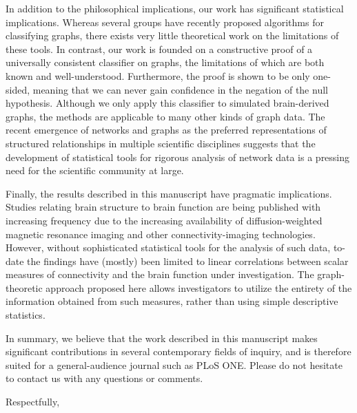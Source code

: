 \documentclass[10pt]{letter}
\begin{document}
\begin{letter}{	%
}
In addition to the philosophical implications, our work has significant statistical implications. 
Whereas several groups have recently proposed algorithms for classifying graphs, there exists very little theoretical work on the limitations of these tools. In contrast, our work is founded on a constructive proof of a universally consistent classifier on graphs, the limitations of which are both known and well-understood. Furthermore, the proof is shown to be only one-sided, meaning that we can never gain confidence in the negation of the null hypothesis. Although we only apply this classifier to simulated brain-derived graphs, the methods are applicable to many other kinds of graph data. The recent emergence of networks and graphs as the preferred representations of structured relationships in multiple scientific disciplines suggests that the development of statistical tools for rigorous analysis of network data is a pressing need for the scientific community at large.

Finally, the results described in this manuscript have pragmatic implications. Studies relating brain structure to brain function are being published with increasing frequency due to the increasing availability of diffusion-weighted magnetic resonance imaging and other connectivity-imaging technologies. However, without sophisticated statistical tools for the analysis of such data, to-date the findings have (mostly) been limited to linear correlations between scalar measures of connectivity and the brain function under investigation. The graph-theoretic approach proposed here allows investigators to utilize the entirety of the information obtained from such measures, rather than using simple descriptive statistics.

In summary, we believe that the work described in this manuscript makes significant contributions in several contemporary fields of inquiry, and is therefore suited for a general-audience journal such as PLoS ONE. %
Please do not hesitate to contact us with any questions or comments.

\closing{Respectfully,}



\end{letter}
\end{document}
